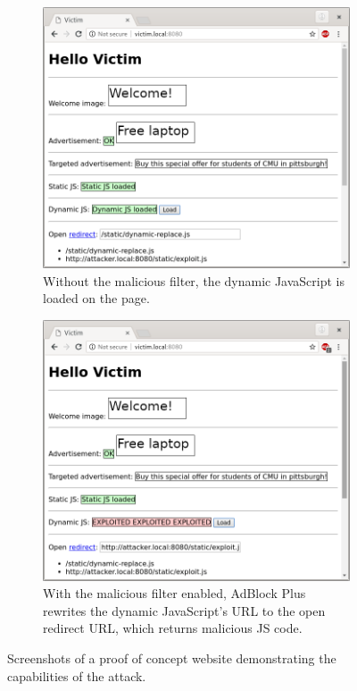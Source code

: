 \documentclass[conference]{IEEEtran}
\begin{document}
\begin{figure}[htp]
     \centering
     \begin{subfigure}[b]{0.5\textwidth}
         \centering
         \includegraphics[width=.9\textwidth]{fig-normal}
         \caption{Without the malicious filter, the dynamic JavaScript is loaded on the page.}
         \label{fig:non-vulnerable}
     \end{subfigure}
     \hfill
     \begin{subfigure}[b]{0.5\textwidth}
         \centering
         \includegraphics[width=.9\textwidth]{fig-attack}
         \caption{With the malicious filter enabled,  AdBlock Plus rewrites the dynamic JavaScript's URL to the open redirect URL, which returns malicious JS code.}
         \label{fig:vulnerable}
     \end{subfigure}
        \caption{Screenshots of a proof of concept website demonstrating the capabilities of the attack.}
        \label{fig:poc}
\end{figure}
\end{document}

